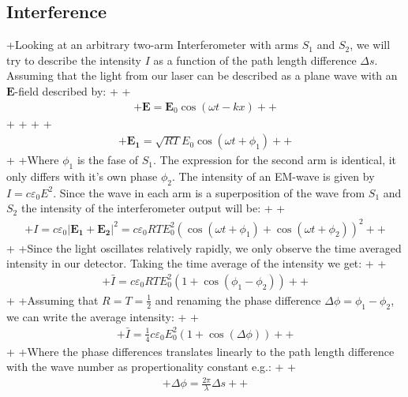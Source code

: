 \subsection{Interference}
+Looking at an arbitrary two-arm Interferometer with arms $S_1$ and $S_2$, we will try to describe the intensity $I$ as a function of the path length difference $\Delta s$. Assuming that the light from our laser can be described as a plane wave with an  $\textbf{E}$-field described by:
+
+\begin{align}
+\mathbf{E}=\mathbf{E}_0 \cos(\omega t-kx)
+\label{efelt}
+\end{align}
+
+%
+
+\begin{align}
+	\mathbf{E_1}=\sqrt{RT}E_0\cos(\omega t+\phi_1)
+	\label{Earm}
+\end{align}
+
+Where $\phi_1$ is the fase of $S_1$. The expression for the second arm is identical, it only differs with it's own phase $\phi_2$. The intensity of an EM-wave is given by $I=c\varepsilon_0 E^2$. Since the wave in each arm is a superposition of the wave from $S_1$ and $S_2$ the intensity of the interferometer output will be:
+
+\begin{align}
+I = c\varepsilon_0 |\mathbf{E_1}+\mathbf{E_2}|^2=c\varepsilon_0 RTE_{0}^2 (\cos(\omega t +\phi_1)+\cos(\omega t+\phi_2))^2
+\label{intensity1}
+\end{align}
+
+Since the light oscillates relatively rapidly, we only observe the time averaged intensity in our detector. Taking the time average of the intensity we get:
+
+\begin{align}
+\bar{I}=c\varepsilon_0 RTE_{0}^2(1+\cos(\phi_1-\phi_2))
+\label{intensityav1}
+\end{align}
+
+Assuming that $R=T=\frac{1}{2}$ and renaming the phase difference $\Delta \phi=\phi_1-\phi_2$, we can write the average intensity:
+
+\begin{align}
+\bar{I}=\frac{1}{4}c\varepsilon_0 E_{0}^2(1+\cos(\Delta \phi))
+\label{intensityav2}
+\end{align}
+
+Where the phase differences translates linearly to the path length difference with the wave number as propertionality constant e.g.:
+
+\begin{align}
+\Delta \phi = \frac{2\pi}{\lambda}\Delta s
+\label{phasetrans}
+\end{align}





